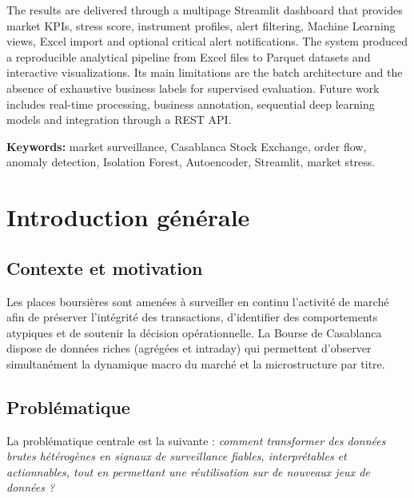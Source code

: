 \documentclass[a4paper,12pt,twoside,openright]{report}
\begin{document}
The results are delivered through a multipage Streamlit dashboard that provides market KPIs, stress score, instrument profiles, alert filtering, Machine Learning views, Excel import and optional critical alert notifications. The system produced a reproducible analytical pipeline from Excel files to Parquet datasets and interactive visualizations. Its main limitations are the batch architecture and the absence of exhaustive business labels for supervised evaluation. Future work includes real-time processing, business annotation, sequential deep learning models and integration through a REST API.

\vspace{0.8cm}
\noindent\textbf{Keywords:} market surveillance, Casablanca Stock Exchange, order flow, anomaly detection, Isolation Forest, Autoencoder, Streamlit, market stress.

\tableofcontents
\listoffigures
\listoftables

\cleardoublepage
{}

\chapter{Introduction générale}
\label{chap:intro}

\section{Contexte et motivation}
Les places boursières sont amenées à surveiller en continu l'activité de marché afin de préserver l'intégrité des transactions, d'identifier des comportements atypiques et de soutenir la décision opérationnelle. La Bourse de Casablanca dispose de données riches (agrégées et intraday) qui permettent d'observer simultanément la dynamique macro du marché et la microstructure par titre.

\section{Problématique}
La problématique centrale est la suivante : \textit{comment transformer des données brutes hétérogènes en signaux de surveillance fiables, interprétables et actionnables, tout en permettant une réutilisation sur de nouveaux jeux de données ?}
\end{document}
